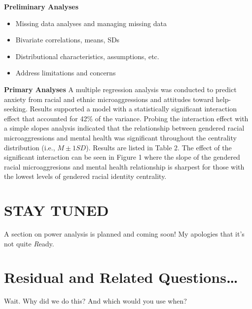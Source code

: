 \documentclass[
  11pt,
]{book}
\providecommand{\tightlist}{%
  \setlength{\itemsep}{0pt}\setlength{\parskip}{0pt}}
\begin{document}
\textbf{Preliminary Analyses}

\begin{itemize}
\tightlist
\item
  Missing data analyses and managing missing data
\item
  Bivariate correlations, means, SDs
\item
  Distributional characteristics, assumptions, etc.
\item
  Address limitations and concerns
\end{itemize}

\textbf{Primary Analyses} A multiple regression analysis was conducted to predict anxiety from racial and ethnic microaggressions and attitudes toward help-seeking. Results supported a model with a statistically significant interaction effect that accounted for 42\% of the variance. Probing the interaction effect with a simple slopes analysis indicated that the relationship between gendered racial microaggressions and mental health was significant throughout the centrality distribution (i.e., \(M \pm 1SD\)). Results are listed in Table 2. The effect of the significant interaction can be seen in Figure 1 where the slope of the gendered racial microaggresions and mental health relationship is sharpest for those with the lowest levels of gendered racial identity centrality.

\hypertarget{stay-tuned-2}{%
\section{STAY TUNED}\label{stay-tuned-2}}

A section on power analysis is planned and coming soon! My apologies that it's not quite \emph{R}eady.

\hypertarget{residual-and-related-questions-1}{%
\section{Residual and Related Questions\ldots{}}\label{residual-and-related-questions-1}}

Wait. Why did we do this? And which would you use when?
\end{document}
